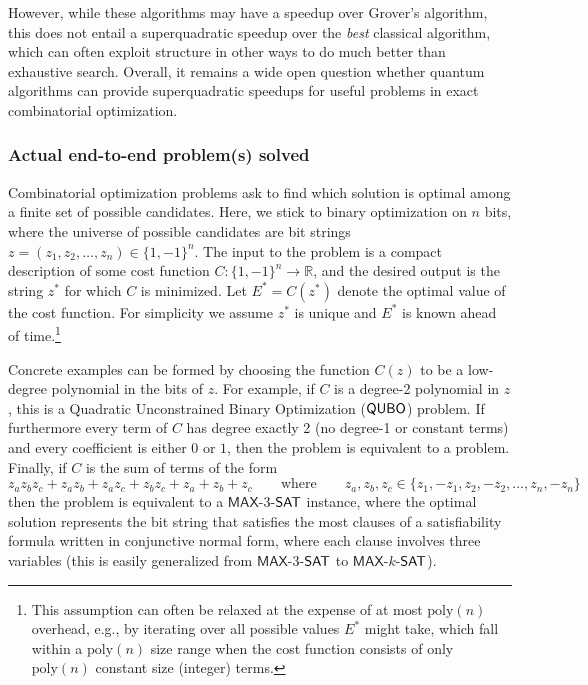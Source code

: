 \begin{refsection}
However, while these algorithms may have a speedup over Grover's algorithm, this does not entail a superquadratic speedup over the \emph{best} classical algorithm, which can often exploit structure in other ways to do much better than exhaustive search. Overall, it remains a wide open question whether quantum algorithms can provide superquadratic speedups for useful problems in exact combinatorial optimization. 




\subsubsection*{Actual end-to-end problem(s) solved}

Combinatorial optimization problems ask to find which solution is optimal among a finite set of possible candidates. Here, we stick to binary optimization on $n$ bits, where the universe of possible candidates are bit strings $z = (z_1,z_2,\ldots,z_n) \in \{1,-1\}^n$. The input to the problem is a compact description of some cost function $C: \{1,-1\}^n \rightarrow \mathbb{R}$, and the desired output is the string $z^*$ for which $C$ is minimized. Let $E^* = C(z^*)$ denote the optimal value of the cost function. For simplicity we assume $z^*$ is unique and $E^*$ is known ahead of time.\footnote{This assumption can often be relaxed at the expense of at most $\mathrm{poly}(n)$ overhead, e.g., by iterating over all possible values $E^*$ might take, which fall within a $\mathrm{poly}(n)$ size range when the cost function consists of only $\mathrm{poly}(n)$ constant size (integer) terms.}

Concrete examples can be formed by choosing the function $C(z)$ to be a low-degree polynomial in the bits of $z$. For example, if $C$ is a degree-2 polynomial in $z$, this is a Quadratic Unconstrained Binary Optimization ($\mathsf{QUBO}$) problem. If furthermore every term of $C$ has degree exactly 2 (no degree-1 or constant terms) and every coefficient is either $0$ or $1$, then the problem is equivalent to a \MAXCUT problem. Finally, if $C$ is the sum of terms of the form 
\begin{equation*}
    z_az_bz_c + z_az_b+z_az_c +z_bz_c + z_a+z_b+z_c \qquad \text{where}\qquad z_a,z_b,z_c \in \{z_1,-z_1,z_2,-z_2,\ldots,z_n,-z_n\}
\end{equation*}
then the problem is equivalent to a $\mathsf{MAX}$-3-$\mathsf{SAT}$ instance, where the optimal solution represents the bit string that satisfies the most clauses of a satisfiability formula written in conjunctive normal form, where each clause involves three variables (this is easily generalized from $\mathsf{MAX}$-3-$\mathsf{SAT}$ to $\mathsf{MAX}$-$k$-$\mathsf{SAT}$). 


\end{refsection}
